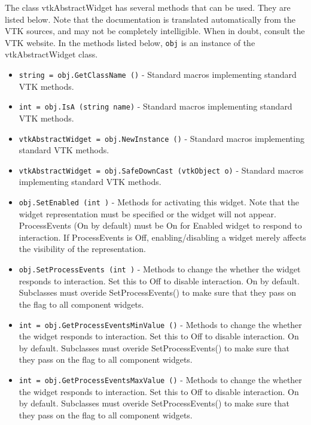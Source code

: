 The class vtkAbstractWidget has several methods that can be used.
  They are listed below.
Note that the documentation is translated automatically from the VTK sources,
and may not be completely intelligible.  When in doubt, consult the VTK website.
In the methods listed below, \verb|obj| is an instance of the vtkAbstractWidget class.
\begin{itemize}
\item  \verb|string = obj.GetClassName ()| -  Standard macros implementing standard VTK methods.

\item  \verb|int = obj.IsA (string name)| -  Standard macros implementing standard VTK methods.

\item  \verb|vtkAbstractWidget = obj.NewInstance ()| -  Standard macros implementing standard VTK methods.

\item  \verb|vtkAbstractWidget = obj.SafeDownCast (vtkObject o)| -  Standard macros implementing standard VTK methods.

\item  \verb|obj.SetEnabled (int )| -  Methods for activating this widget. Note that the widget representation
 must be specified or the widget will not appear.
 ProcessEvents (On by default) must be On for Enabled widget to respond 
 to interaction. If ProcessEvents is Off, enabling/disabling a widget 
 merely affects the visibility of the representation.

\item  \verb|obj.SetProcessEvents (int )| -  Methods to change the whether the widget responds to interaction.
 Set this to Off to disable interaction. On by default.
 Subclasses must overide SetProcessEvents() to make sure
 that they pass on the flag to all component widgets.

\item  \verb|int = obj.GetProcessEventsMinValue ()| -  Methods to change the whether the widget responds to interaction.
 Set this to Off to disable interaction. On by default.
 Subclasses must overide SetProcessEvents() to make sure
 that they pass on the flag to all component widgets.

\item  \verb|int = obj.GetProcessEventsMaxValue ()| -  Methods to change the whether the widget responds to interaction.
 Set this to Off to disable interaction. On by default.
 Subclasses must overide SetProcessEvents() to make sure
 that they pass on the flag to all component widgets.


\end{itemize}
